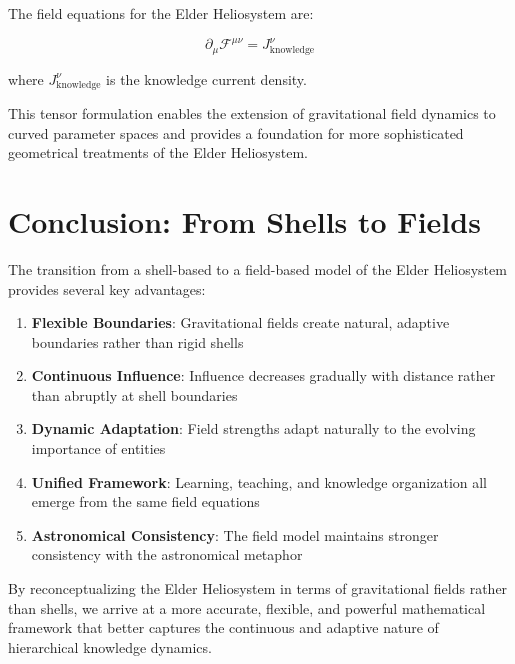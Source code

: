 \begin{theorem}
The field equations for the Elder Heliosystem are:

\begin{equation}
\partial_\mu \mathcal{F}^{\mu\nu} = J^\nu_{\text{knowledge}}
\end{equation}

where $J^\nu_{\text{knowledge}}$ is the knowledge current density.
\end{theorem}

This tensor formulation enables the extension of gravitational field dynamics to curved parameter spaces and provides a foundation for more sophisticated geometrical treatments of the Elder Heliosystem.

\section{Conclusion: From Shells to Fields}

The transition from a shell-based to a field-based model of the Elder Heliosystem provides several key advantages:

\begin{enumerate}
    \item \textbf{Flexible Boundaries}: Gravitational fields create natural, adaptive boundaries rather than rigid shells
    \item \textbf{Continuous Influence}: Influence decreases gradually with distance rather than abruptly at shell boundaries
    \item \textbf{Dynamic Adaptation}: Field strengths adapt naturally to the evolving importance of entities
    \item \textbf{Unified Framework}: Learning, teaching, and knowledge organization all emerge from the same field equations
    \item \textbf{Astronomical Consistency}: The field model maintains stronger consistency with the astronomical metaphor
\end{enumerate}

By reconceptualizing the Elder Heliosystem in terms of gravitational fields rather than shells, we arrive at a more accurate, flexible, and powerful mathematical framework that better captures the continuous and adaptive nature of hierarchical knowledge dynamics.